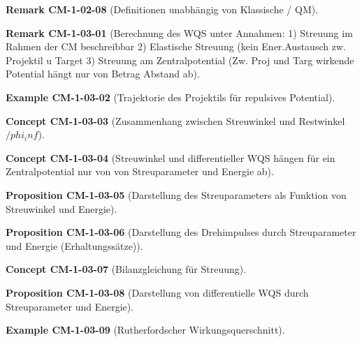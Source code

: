 \documentclass[10pt, letterpaper]{article}
\newcommand{\CustomHeading}[3]{%
  \par\medskip\noindent%
  \textbf{#1 #2} \textnormal{(#3)}.\enskip%
}
\newenvironment{PROP}[2]{\CustomHeading{Proposition}{#1}{#2}}{}
\newenvironment{REM}[2]{\CustomHeading{Remark}{#1}{#2}}{}
\newenvironment{EXA}[2]{\CustomHeading{Example}{#1}{#2}}{}
\newenvironment{CONC}[2]{\CustomHeading{Concept}{#1}{#2}}{}
\begin{document}
\begin{REM}{CM-1-02-08}{Definitionen unabhängig von Klassische / QM}
\end{REM}

\begin{REM}{CM-1-03-01}{Berechnung des WQS unter Annahmen:
1) Streuung im Rahmen der CM beschreibbar
2) Elastische Streuung (kein Ener.Austausch zw. Projektil u Target
3) Streuung am Zentralpotential (Zw. Proj und Targ wirkende Potential hängt nur von Betrag Abstand ab}
\end{REM}

\begin{EXA}{CM-1-03-02}{Trajektorie des Projektils für repulsives Potential}
\end{EXA}

\begin{CONC}{CM-1-03-03}{Zusammenhang zwischen Streuwinkel und Restwinkel $/phi_inf$}
\end{CONC}

\begin{CONC}{CM-1-03-04}{Streuwinkel und differentieller WQS hängen für ein Zentralpotential nur von von Streuparameter und Energie ab}
\end{CONC}

\begin{PROP}{CM-1-03-05}{Darstellung des Streuparameters als Funktion von Streuwinkel und Energie}
\end{PROP}

\begin{PROP}{CM-1-03-06}{Darstellung des Drehimpulses durch Streuparameter und Energie (Erhaltungssätze)}
\end{PROP}

\begin{CONC}{CM-1-03-07}{Bilanzgleichung für Streuung}
\end{CONC}

\begin{PROP}{CM-1-03-08}{Darstellung von differentielle WQS durch Streuparameter und Energie}
\end{PROP}

\begin{EXA}{CM-1-03-09}{Rutherfordscher Wirkungsquerschnitt}
\end{EXA}
\end{document}
